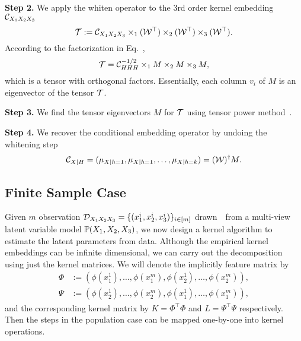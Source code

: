 \documentclass{article}
\begin{document}
{\bf Step 2.} We apply the whiten operator to the 3rd order kernel embedding $\mathcal{C}_{X_1 X_2 X_3}$
$$
  {\mathcal{T}} := \mathcal{C}_{X_1 X_2 X_3} \times_1 (\mathcal{W}^\top) \times_2 (\mathcal{W}^\top) \times_3 (\mathcal{W}^\top).
$$
According to the factorization in Eq.~,
$$
  {\mathcal{T}} = \mathcal{C}_{HHH}^{-1/2} \times_1 M \times_2 M \times_3 M,
$$
which is a tensor with orthogonal factors. Essentially, each column $v_i$ of $M$ is an eigenvector of the tensor ${\mathcal{T}}$.

{\bf Step 3.} We find the tensor eigenvectors $M$ for ${\mathcal{T}}$ using tensor power method~\cite{AnandkumarEtal:community12}.

{\bf Step 4.} We recover the conditional embedding operator by undoing the whitening step
$$
  \mathcal{C}_{X|H} = (\mu_{X|h=1},\mu_{X|h=1},\ldots,\mu_{X|h=k}) = (\mathcal{W})^\dagger M.
$$

\subsection{Finite Sample Case}

Given $m$ observation $\mathcal{D}_{X_1 X_2 X_3}=\{(x_1^i,x_2^i,x_3^i)\}_{i \in [m]}$ drawn~\iid~from a multi-view latent variable model $\mathbb{P}(X_1,X_2,X_3)$, we now design a kernel algorithm to estimate the latent parameters from data. Although the empirical kernel embeddings can be infinite dimensional, we can carry out the decomposition using just the kernel matrices.
We will denote the implicitly feature matrix by
\begin{align*}
  \Phi &:= (\phi(x_1^1), \ldots, \phi(x_1^m), \phi(x_2^1),  \ldots, \phi(x_2^m)),  \\
  \Psi &:= (\phi(x_2^1), \ldots, \phi(x_2^m), \phi(x_1^1),  \ldots, \phi(x_1^m)),
\end{align*}
and the corresponding kernel matrix by $K = \Phi^\top \Phi$ and $L = \Psi^\top \Psi$ respectively.
Then the steps in the population case can be mapped one-by-one into kernel operations.
\end{document}
